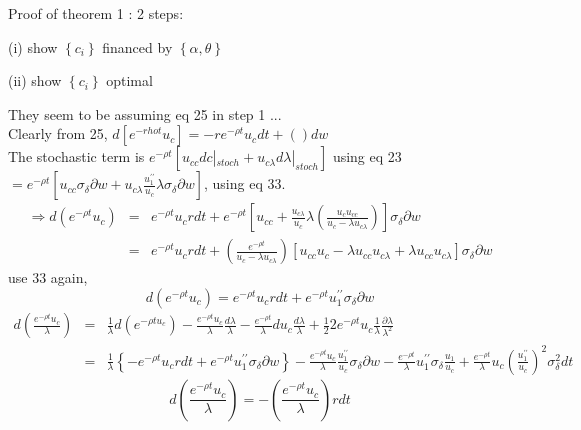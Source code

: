 \documentclass[]{article}
\begin{document}
Proof of theorem 1 : 2 steps:
\begin{list}{ }{}
\item (i) show $\left\{c_i\right\}$ financed by $\left\{\alpha, \theta\right\}$
\item (ii) show $\left\{c_i\right\}$ optimal
\end{list}

They seem to be assuming eq 25 in step 1 ...\\

Clearly from 25, $d[e^{-rho t} u_c] = -r e^{-\rho t} u_c dt + () dw$ \\
The stochastic term is $e^{-\rho t}[u_{cc}dc|_{stoch} + u_{c\lambda} d\lambda |_{stoch}]$ using eq 23\\
$= e^{-\rho t} [u_{cc} \sigma_\delta \partial w + u_{c\lambda} \frac{u_1^{\prime\prime}}{u_c}\lambda \sigma_\delta \partial w]$, using eq 33.
\begin{eqnarray*}
\Rightarrow d(e^{-\rho t}u_c) &=& e^{-\rho t}u_c r dt + e^{-\rho t} \left[u_{cc} + \frac{u_{c\lambda}}{u_c} \lambda \left(\frac{u_c u_{cc}}{u_c - \lambda u_{c\lambda}}\right)\right] \sigma_\delta \partial w\\
&=& e^{-\rho t}u_c r dt  + \left(\frac{e^{-\rho t}}{u_c-\lambda u_{c\lambda}}\right)[u_{cc}u_c - \lambda u_{cc} u_{c\lambda} + \lambda u_{cc} u_{c\lambda}]\sigma_\delta \partial w
\end{eqnarray*}
use 33 again,
\begin{equation}
d(e^{-\rho t}u_c) = e^{-\rho t}u_c r dt + e^{-\rho t} u_1^{\prime\prime} \sigma_\delta \partial w \tag{34}
\end{equation}
\begin{eqnarray*}
d\left(\frac{e^{-\rho t} u_c}{\lambda}\right) &=& \frac{1}{\lambda} d(e^{-\rho t u_c}) - \frac{e^{-\rho t}u_c}{\lambda} \frac{d\lambda}{\lambda} - \frac{e^{-\rho t}}{\lambda} du_c \frac{d\lambda}{\lambda} + \frac{1}{2} 2 e^{-\rho t} u_c \frac{1}{\lambda} \frac{\partial \lambda}{\lambda^2}\\
&=& \frac{1}{\lambda} \left\{-e^{-\rho t} u_crdt + e^{-\rho t} u_1^{\prime\prime} \sigma_\delta \partial w\right\} - \frac{e^{-\rho t}u_c}{\lambda} \frac{u_1^{\prime\prime}}{u_c} \sigma_\delta \partial w - \frac{e^{-\rho t}}{\lambda} u_1^{\prime\prime} \sigma_\delta \frac{u_1}{u_c} + \frac{e^{-\rho t}}{\lambda} u_c \left(\frac{u_1^{\prime\prime}}{u_c}\right)^2 \sigma_\delta^2 dt
\end{eqnarray*}
\begin{equation}
d\left(\frac{e^{-\rho t} u_c}{\lambda}\right) = -\left(\frac{e^{-\rho t} u_c}{\lambda}\right) r dt \tag{35}
\end{equation}
\end{document}
